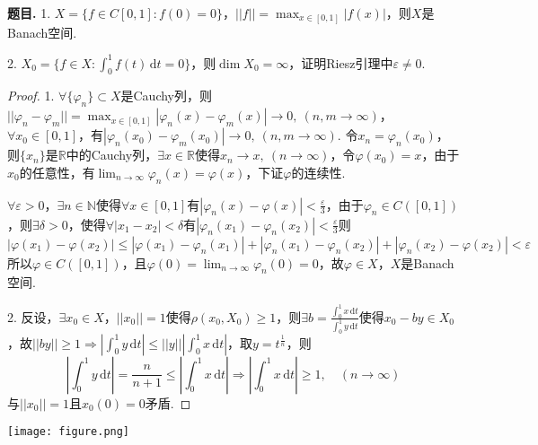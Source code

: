 \documentclass[12pt, a4paper, oneside]{ctexart}
\newcounter{problem}  %
\newenvironment{problem}{\stepcounter{problem}\par\noindent\textbf{题目\arabic{problem}. }}{\smallskip\par}
\let\leq=\leqslant %
\let\geq=\geqslant %
\def\R{\mathbb{R}}          %
\def\N{\mathbb{N}}          %
\def\d{\mathrm{d}}          %
\begin{document}
\begin{problem}
    1. $X = \{f\in C[0,1]:f(0)=0\}$，$||f||=\max_{x\in[0,1]}|f(x)|$，则$X$是Banach空间.

    2. $X_0=\{f\in X: \int_0^1f(t)\,\d t=0\}$，则$\dim X_0=\infty$，证明Riesz引理中$\varepsilon\neq 0$.
\end{problem}
\begin{proof}
    1. $\forall\{\varphi_n\}\subset X$是Cauchy列，则$||\varphi_n-\varphi_m||=\max_{x\in[0,1]}|\varphi_n(x)-\varphi_m(x)|\to0,\ (n,m\to\infty)$，$\forall x_0\in [0,1]$，有$|\varphi_n(x_0) - \varphi_m(x_0)|\to 0,\ (n,m\to\infty)$. 令$x_n = \varphi_n(x_0)$，则$\{x_n\}$是$\R$中的Cauchy列，$\exists x\in\R$使得$x_n\to x,\ (n\to\infty)$，令$\varphi(x_0) = x$，由于$x_0$的任意性，有$\lim_{n\to\infty}\varphi_n(x) = \varphi(x)$，下证$\varphi$的连续性.

    $\forall \varepsilon > 0$，$\exists n\in\N$使得$\forall x\in [0,1]$有$|\varphi_n(x)-\varphi(x)| < \frac{\varepsilon}{3}$，由于$\varphi_n\in C([0,1])$，则$\exists \delta >0$，使得$\forall |x_1-x_2| < \delta$有$|\varphi_n(x_1)-\varphi_n(x_2)| < \frac{\varepsilon}{3}$则
    \begin{equation*}
        |\varphi(x_1)-\varphi(x_2)|\leq |\varphi(x_1)-\varphi_n(x_1)|+|\varphi_n(x_1)-\varphi_n(x_2)|+|\varphi_n(x_2)-\varphi(x_2)| < \varepsilon
    \end{equation*}
    所以$\varphi\in C([0,1])$，且$\varphi(0) = \lim_{n\to\infty}\varphi_n(0) = 0$，故$\varphi \in X$，$X$是Banach空间.

    2. 反设，$\exists x_0\in X$，$||x_0|| = 1$使得$\rho(x_0, X_0)\geq 1$，则$\exists b = \frac{\int_0^1x\,\d t}{\int_0^1 y\,\d t}$使得$x_0-by \in X_0$，故$||by|| \geq 1\Rightarrow \left|\int_0^1y\,\d t\right|\leq ||y||\left|\int_0^1x\,\d t\right|$，取$y = t^{\frac{1}{n}}$，则
    \begin{equation*}
        \left|\int_0^1y\,\d t\right| = \frac{n}{n+1}\leq \left|\int_0^1x\,\d t\right|\Rightarrow \left|\int_0^1x\,\d t\right|\geq 1,\quad(n\to\infty)
    \end{equation*}
    与$||x_0|| = 1$且$x_0(0) = 0$矛盾.
\end{proof}
\iffalse
\centerline{
    \texttt{[image: figure.png]}
}
\renewcommand\arraystretch{0.8} %
\end{document}
